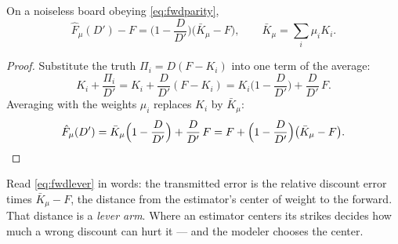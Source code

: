 \begin{proposition}
\label{prop:fwdlever}
On a noiseless board obeying \eqref{eq:fwdparity},
\begin{equation}
\hat F_\mu(D')-F
=\Big(1-\frac{D}{D'}\Big)\big(\bar K_\mu-F\big),
\qquad
\bar K_\mu=\sum_i\mu_iK_i .
\label{eq:fwdlever}
\end{equation}
\end{proposition}

\begin{proof}
Substitute the truth $\Pi_i=D(F-K_i)$ into one term of the average:
\[
K_i+\frac{\Pi_i}{D'}
=K_i+\frac{D}{D'}(F-K_i)
=K_i\Big(1-\frac{D}{D'}\Big)+\frac{D}{D'}\,F .
\]
Averaging with the weights $\mu_i$ replaces $K_i$ by $\bar K_\mu$:
\[
\hat F_\mu(D')
=\bar K_\mu\Big(1-\frac{D}{D'}\Big)+\frac{D}{D'}\,F
=F+\Big(1-\frac{D}{D'}\Big)\big(\bar K_\mu-F\big). \qedhere
\]
\end{proof}

Read \eqref{eq:fwdlever} in words: the transmitted error is the
relative discount error times $\bar K_\mu-F$, the distance from the
estimator's center of weight to the forward.  That distance is a
\emph{lever arm}.  Where an estimator centers its strikes decides how
much a wrong discount can hurt it --- and the modeler chooses the
center.

